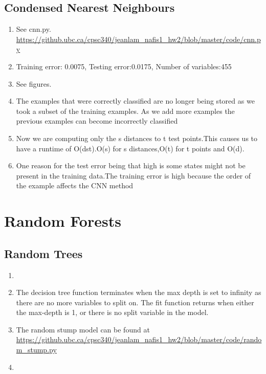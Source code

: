 \documentclass{article}
\begin{document}
\subsection{Condensed Nearest Neighbours}
\begin{enumerate}
\item See cnn.py. \url{https://github.ubc.ca/cpsc340/jeanlam_nafis1_hw2/blob/master/code/cnn.py}
\item Training error: 0.0075, Testing error:0.0175, Number of variables:455
\item See figures. 
\item The examples that were correctly classified are no longer being stored as we took a subset of the training examples. As we add more examples the previous examples can become incorrectly classified
\item Now we are computing only the s distances to t test points.This causes us to have a runtime of O(dst).O(s) for s distances,O(t) for t points and O(d).
\item One reason for the test error being that high is some states might not be present in the training data.The training error is high because the order of the example affects the CNN method

\end{enumerate}

\section{Random Forests}
\subsection{Random Trees}
\begin{enumerate}
\item {}
\item The decision tree function terminates when the max depth is set to infinity as there are no more variables to split on. The fit function returns when either the max-depth is 1, or there is no split variable in the model.
\item {} The random stump model can be found at \url{https://github.ubc.ca/cpsc340/jeanlam_nafis1_hw2/blob/master/code/random_stump.py}
\item {}
\end{enumerate}
\end{document}
